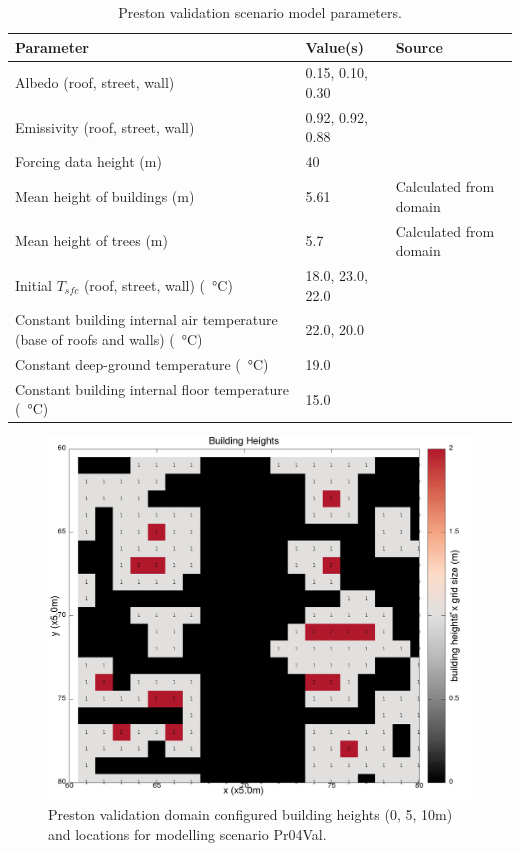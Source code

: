 \documentclass[final,3p,times,authoryear]{elsarticle}
\begin{document}
\begin{table}[!htbp]
\caption{Preston validation scenario model parameters. \label{tab:modprvalpara}}     
\begin{tabular}{| p{8.0cm} | l | l|}
\hline
\textbf{Parameter} & \textbf{Value(s)} & \textbf{Source}\\ \hline
Albedo (roof, street, wall)   & 0.15, 0.10, 0.30   & \cite{Krayenhoff2007}\\ \hline
Emissivity (roof, street, wall)   & 0.92, 0.92, 0.88   & \cite{Krayenhoff2007}\\ \hline
Forcing data height (m)  & 40   & \cite{Coutts2007} \\ \hline
Mean height of buildings (m)  & 5.61   & Calculated from domain \\ \hline
Mean height of trees (m)  & 5.7   & Calculated from domain \\ \hline
Initial $T_{sfc}$ (roof, street, wall) (\SI{}{\degreeCelsius})  & 18.0, 23.0, 22.0  & \cite{Krayenhoff2007}  \\ \hline
Constant building internal air temperature (base of roofs and walls) (\SI{}{\degreeCelsius})  & 22.0, 20.0 & \cite{Krayenhoff2007}   \\ \hline
Constant deep-ground temperature (\SI{}{\degreeCelsius})  & 19.0  & \cite{Krayenhoff2007} \\ \hline
Constant building internal floor temperature (\SI{}{\degreeCelsius})  & 15.0  & \cite{Krayenhoff2007} \\ \hline
\end{tabular}
\end{table}

\begin{figure}[!htbp]
\includegraphics[trim = 0mm 0mm 0mm 0mm, clip, scale=0.20]{images/CentralBuildingHeights.png} 
\caption{Preston validation domain configured building heights (0, 5, 10m) and locations for modelling scenario Pr04Val.\label{fig:PrestonBldHt}}      
\end{figure}
\end{document}
